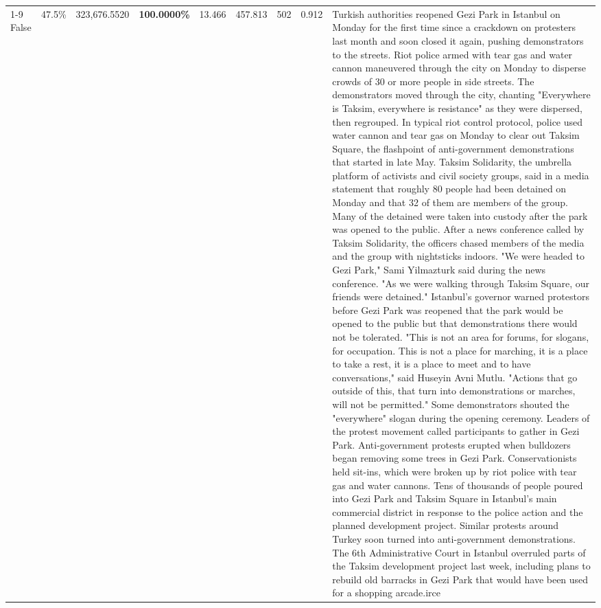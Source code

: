\begin{table}[H]
\begin{tabular}{lllrlllll}
\cline{1-9}
False & 47.5\% & 323,676.5520 & \bfseries \color{red} 100.0000\% & 13.466 & 457.813 & 502 & 0.912 & Turkish authorities reopened Gezi Park in Istanbul on Monday for the first time since a crackdown on protesters last month and soon closed it again, pushing demonstrators to the streets. Riot police armed with tear gas and water cannon maneuvered through the city on Monday to disperse crowds of 30 or more people in side streets. The demonstrators moved through the city, chanting "Everywhere is Taksim, everywhere is resistance" as they were dispersed, then regrouped. In typical riot control protocol, police used water cannon and tear gas on Monday to clear out Taksim Square, the flashpoint of anti-government demonstrations that started in late May. Taksim Solidarity, the umbrella platform of activists and civil society groups, said in a media statement that roughly 80 people had been detained on Monday and that 32 of them are members of the group. Many of the detained were taken into custody after the park was opened to the public. After a news conference called by Taksim Solidarity, the officers chased members of the media and the group with nightsticks indoors. "We were headed to Gezi Park," Sami Yilmazturk said during the news conference. "As we were walking through Taksim Square, our friends were detained." Istanbul's governor warned protestors before Gezi Park was reopened that the park would be opened to the public but that demonstrations there would not be tolerated. "This is not an area for forums, for slogans, for occupation. This is not a place for marching, it is a place to take a rest, it is a place to meet and to have conversations," said Huseyin Avni Mutlu. "Actions that go outside of this, that turn into demonstrations or marches, will not be permitted." Some demonstrators shouted the "everywhere" slogan during the opening ceremony. Leaders of the protest movement called participants to gather in Gezi Park. Anti-government protests erupted when bulldozers began removing some trees in Gezi Park. Conservationists held sit-ins, which were broken up by riot police with tear gas and water cannons. Tens of thousands of people poured into Gezi Park and Taksim Square in Istanbul's main commercial district in response to the police action and the planned development project. Similar protests around Turkey soon turned into anti-government demonstrations. The 6th Administrative Court in Istanbul overruled parts of the Taksim development project last week, including plans to rebuild old barracks in Gezi Park that would have been used for a shopping arcade.irce \\

\end{tabular}
\end{table}
